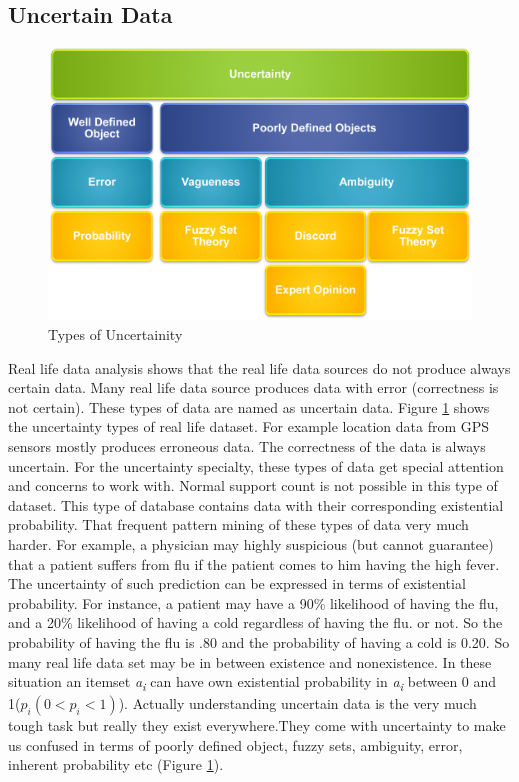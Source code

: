 \subsection{Uncertain Data}
\begin{figure}
\centering
  \includegraphics[width=.9\textwidth]{images/uncertainity_type.jpg}
\caption{Types of Uncertainity}
\label{figure:uncertainity_type}
\end{figure}
Real life data analysis shows that the real life data sources do not produce always certain data. Many real life data source produces data with error (correctness is not certain). These types of data are named as uncertain data. Figure \ref{figure:uncertainity_type} shows the uncertainty types of real life dataset. For example location data from GPS sensors mostly produces erroneous data. The correctness of the data is always uncertain. For the uncertainty specialty, these types of data get special attention and concerns to work with. Normal support count is not possible in this type of dataset. This type of database contains data with their corresponding existential probability. That frequent pattern mining of these types of data very much harder. For example, a physician may highly suspicious (but cannot guarantee) that a patient suffers from flu if the patient comes to him having the high fever. The uncertainty of such prediction can be expressed in terms of existential probability. For instance, a patient may have a 90\% likelihood of having the flu, and a 20\% likelihood of having a cold regardless of having the flu. or not. So the probability of having the flu is .80 and the probability of having a cold is 0.20. So many real life data set may be in between existence and nonexistence. In these situation an itemset \emph{a\textsubscript{i}} can have own existential probability in \emph{a\textsubscript{i}} between 0 and 1($p_i(0<p_i<1)$). Actually understanding uncertain data is the very much tough task but really they exist everywhere.They come with uncertainty to make us confused in terms of poorly defined object, fuzzy sets, ambiguity, error, inherent probability etc (Figure \ref{figure:uncertainity_type}).\\
